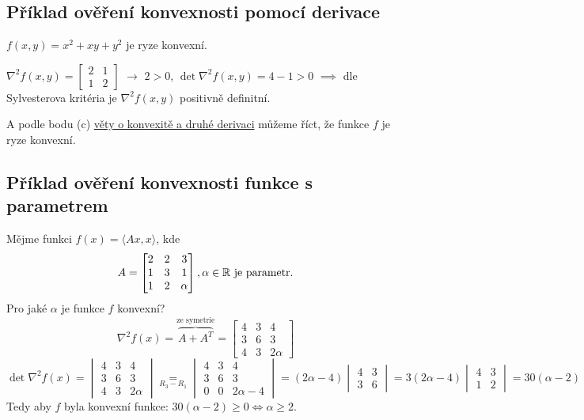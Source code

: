 \subsection{Příklad ověření konvexnosti pomocí derivace}
$f(x, y) = x^2 + xy + y^2$ je ryze konvexní.

$\nabla^2 f(x, y) =
\begin{bmatrix}
    2 & 1 \\
    1 & 2
\end{bmatrix}$ $\rightarrow$ $2>0$, $\det \nabla^2 f(x,y) = 4-1>0$ $\implies$ dle Sylvesterova kritéria je
$\nabla^2 f(x,y)$ positivně definitní.

A podle bodu (c) \hyperref[konvDDeriv]{věty o konvexitě a druhé derivaci} můžeme říct, že funkce $f$ je ryze konvexní.

\subsection{Příklad ověření konvexnosti funkce s parametrem}
Mějme funkci $f(x) = \langle Ax, x\rangle$, kde
\[
A = \begin{bmatrix}
    2 & 2 & 3 \\
    1 & 3 & 1 \\
    1 & 2 & \alpha
\end{bmatrix}, \alpha \in \mathbb{R} \text{ je parametr.}
\]
Pro jaké $\alpha$ je funkce $f$ konvexní?
\[
    \nabla^2 f(x) = \overbrace{A + A^T}^{\text{ze symetrie}} =
    \begin{bmatrix}
        4 & 3 & 4 \\
        3 & 6 & 3 \\
        4 & 3 & 2 \alpha
    \end{bmatrix}
\]
\[
    \det \nabla^2 f(x) =
    \begin{vmatrix}
        4 & 3 & 4 \\
        3 & 6 & 3 \\
        4 & 3 & 2 \alpha
    \end{vmatrix} \underset{R_3 - R_1}{=}
    \begin{vmatrix}
        4 & 3 & 4 \\
        3 & 6 & 3 \\
        0 & 0 & 2 \alpha - 4
    \end{vmatrix} = (2 \alpha - 4)
    \begin{vmatrix}
        4 & 3 \\
        3 & 6
    \end{vmatrix} = 3 (2 \alpha - 4)
    \begin{vmatrix}
        4 & 3 \\
        1 & 2
    \end{vmatrix} = 30 (\alpha - 2)
\]
Tedy aby $f$ byla konvexní funkce: $30 (\alpha - 2) \geq 0 \iff \alpha \geq 2$.

